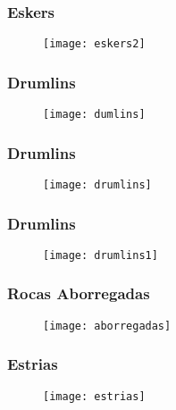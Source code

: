 \documentclass{beamer}
\begin{document}
\begin{frame}
\frametitle{Eskers}
\begin{figure}
\begin{center}
\texttt{[image: eskers2]}
\end{center}
\end{figure}
\end{frame}
\begin{frame}
\frametitle{Drumlins}
\begin{figure}
\begin{center}
\texttt{[image: dumlins]}
\end{center}
\end{figure}
\end{frame}
\begin{frame}
\frametitle{Drumlins}
\begin{figure}
\begin{center}
\texttt{[image: drumlins]}
\end{center}
\end{figure}
\end{frame}
\begin{frame}
\frametitle{Drumlins}
\begin{figure}
\begin{center}
\texttt{[image: drumlins1]}
\end{center}
\end{figure}
\end{frame}
\begin{frame}
\frametitle{Rocas Aborregadas}
\begin{figure}
\begin{center}
\texttt{[image: aborregadas]}
\end{center}
\end{figure}
\end{frame}
\begin{frame}
\frametitle{Estrias}
\begin{figure}
\begin{center}
\texttt{[image: estrias]}
\end{center}
\end{figure}
\end{frame}
\end{document}
